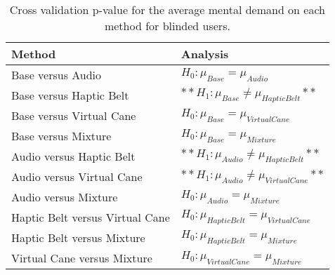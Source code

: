 
\begin{table}[!htb]
\centering
\caption{Cross validation p-value for the average mental demand on each method for blinded users.}
\label{tab:lsd_mental_demand_avg}
\begin{tabular}{ll}
\toprule
                         Method &                                      Analysis \\
\midrule
              Base versus Audio &               $H_{0} :  \mu_{Base} =  \mu_{Audio}$ \\
        Base versus Haptic Belt &       $**H_{1} :  \mu_{Base} \ne  \mu_{Haptic Belt}**$ \\
       Base versus Virtual Cane &        $H_{0} :  \mu_{Base} =  \mu_{Virtual Cane}$ \\
            Base versus Mixture &             $H_{0} :  \mu_{Base} =  \mu_{Mixture}$ \\
       Audio versus Haptic Belt &      $**H_{1} :  \mu_{Audio} \ne  \mu_{Haptic Belt}**$ \\
      Audio versus Virtual Cane &     $**H_{1} :  \mu_{Audio} \ne  \mu_{Virtual Cane}**$ \\
           Audio versus Mixture &            $H_{0} :  \mu_{Audio} =  \mu_{Mixture}$ \\
Haptic Belt versus Virtual Cane & $H_{0} :  \mu_{Haptic Belt} =  \mu_{Virtual Cane}$ \\
     Haptic Belt versus Mixture &      $H_{0} :  \mu_{Haptic Belt} =  \mu_{Mixture}$ \\
    Virtual Cane versus Mixture &     $H_{0} :  \mu_{Virtual Cane} =  \mu_{Mixture}$ \\
\bottomrule
\end{tabular}
\end{table}

